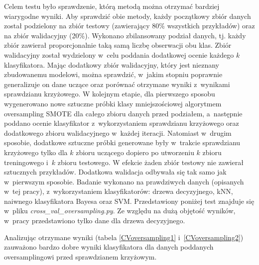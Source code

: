 Celem testu było sprawdzenie, którą metodą można otrzymać bardziej wiarygodne wyniki. Aby sprawdzić obie metody, każdy początkowy zbiór danych został podzielony na zbiór testowy (zawierający 80\% wszystkich przykładów) oraz na zbiór walidacyjny (20\%). Wykonano zbilansowany podział danych, tj. każdy zbiór zawierał proporcjonalnie taką samą liczbę obserwacji obu klas. Zbiór walidacyjny został wydzielony w~celu poddania dodatkowej ocenie każdego $k$ klasyfikatora. Mając dodatkowy zbiór walidacyjny, który jest nieznany zbudowanemu modelowi, można sprawdzić, w~jakim stopniu poprawnie generalizuje on dane uczące oraz porównać otrzymane wyniki z~wynikami sprawdzianu krzyżowego. W kolejnym etapie, dla pierwszego sposobu wygenerowano nowe sztuczne próbki klasy mniejszościowej algorytmem oversampling SMOTE dla całego zbioru danych przed podziałem, a~następnie poddano ocenie klasyfikator z~wykorzystaniem sprawdzianu krzyżowego oraz dodatkowego zbioru walidacyjnego w~każdej iteracji. Natomiast w~drugim sposobie, dodatkowe sztuczne próbki generowane były w~trakcie sprawdzianu krzyżowego tylko dla $k$ zbioru uczącego dopiero po utworzeniu $k$ zbioru treningowego i~$k$ zbioru testowego. W efekcie żaden zbiór testowy nie zawierał sztucznych przykładów. Dodatkowa walidacja odbywała się tak samo jak w~pierwszym sposobie. Badanie wykonano na prawdziwych danych (opisanych w~tej pracy), z~wykorzystaniem klasyfikatorów: drzewa decyzyjnego, kNN, naiwnego klasyfikatora Bayesa oraz SVM. Przedstawiony poniżej test znajduje się w~pliku \textit{cross\_val\_oversampling.py}. Ze względu na dużą objętość wyników, w~pracy przedstawiono tylko dane dla drzewa decyzyjnego. \par
Analizując otrzymane wyniki (tabela \ref{CVoversampling1} i~\ref{CVoversampling2}) zauważono bardzo dobre wyniki klasyfikatora dla danych poddanych oversamplingowi przed sprawdzianem krzyżowym.
